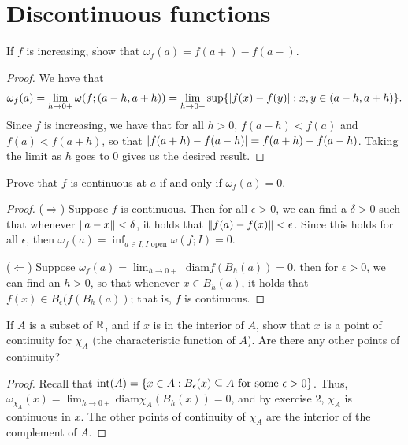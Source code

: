 \section{Discontinuous functions}


\begin{exercise}{1}
If $f$ is increasing, show that $\omega_f(a)=f(a+)-f(a-)$.
\end{exercise}
\begin{proof}
We have that 
\begin{align*}
    \omega_f(a) = \lim_{h\to0+}\omega(f;(a-h,a+h)) = \lim_{h \to 0+} \sup\{\left\lvert f(x)-f(y)\right\rvert: x,y\in (a-h,a+h)\}.
\end{align*}
Since $f$ is increasing, we have that for all $h>0$, $f(a-h)<f(a)$ and $f(a)<f(a+h)$, so that $\left\lvert f(a+h)-f(a-h)\right\rvert = f(a+h)-f(a-h)$.
Taking the limit as $h$ goes to 0 gives us the desired result.
\end{proof} 

\begin{exercise}{2}
Prove that $f$ is continuous at $a$ if and only if $\omega_f(a)=0$.
\end{exercise}
\begin{proof}
($\Rightarrow$)
Suppose $f$ is continuous.
Then for all $\epsilon>0$, we can find a $\delta>0$ such that whenever $\left\lVert a-x\right\rVert<\delta$, it holds that $\left\lVert f(a)-f(x)\right\rVert<\epsilon$. 
Since this holds for all $\epsilon$, then $\omega_f(a) = \inf_{a\in I, I\text{ open}}\omega(f; I) = 0$.

($\Leftarrow$)
Suppose $\omega_f(a)= \lim_{h\to 0+}\text{ diam}f(B_h(a)) = 0$, then for $\epsilon>0$, we can find an $h>0$, so that whenever $x\in B_h(a)$, it holds that $f(x) \in B_\epsilon(f(B_h(a))$;
that is, $f$ is continuous.
\end{proof} 

\begin{exercise}{5}
If $A$ is a subset of $\mathbb{R}$, and if $x$ is in the interior of $A$, show that $x$ is a point of continuity for $\chi_A$ (the characteristic function of $A$).
Are there any other points of continuity?
\end{exercise}
\begin{proof}
Recall that $\text{int}(A)=\{x\in A:B_\epsilon(x)\subseteq A\text{ for some }\epsilon>0\}$.
Thus, $\omega_{\chi_A}(x) = \lim_{h\to 0+}\text{diam}\chi_A(B_h(x)) = 0$, and by exercise 2, $\chi_A$ is continuous in $x$.
The other points of continuity of $\chi_A$ are the interior of the complement of $A$.
\end{proof} 

